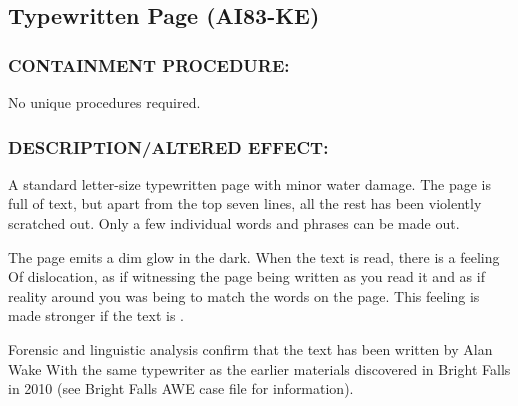 \subsection*{Typewritten Page (AI83-KE)}
\subsubsection*{CONTAINMENT PROCEDURE:}
\par No unique procedures required.
\subsubsection*{DESCRIPTION/ALTERED EFFECT:}
\par A standard letter-size typewritten page
with minor water damage. The page is
full of text, but apart from the top seven
lines, all the rest has been violently
scratched out. Only a few individual
words and phrases can be made out.
\par The page emits a dim glow in the dark. When the text is read,
there is a feeling Of dislocation, as if witnessing the page being
written as you read it and as if reality around you was being 
to match the words on the page. This feeling is made
stronger if the text is .
\par Forensic and linguistic analysis confirm that the text has been
written by Alan Wake With the same typewriter as the earlier
materials discovered in Bright Falls in 2010 (see Bright Falls
AWE case file for information).